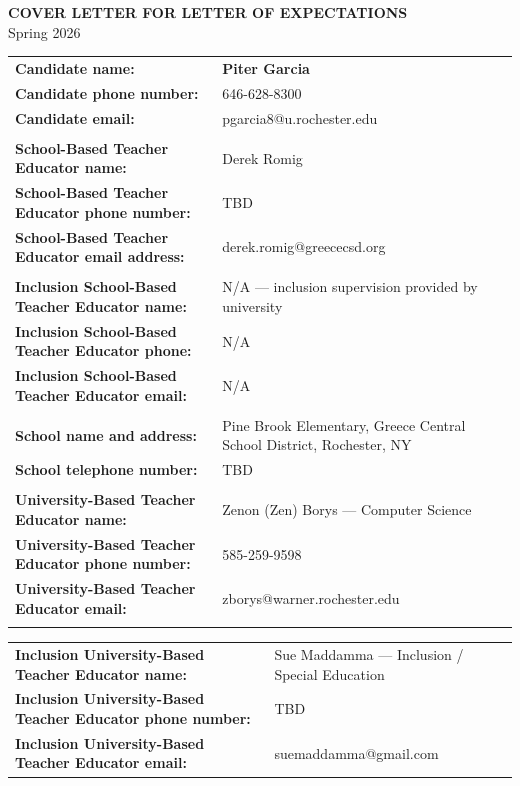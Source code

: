 \documentclass[10pt]{article}
\makeatletter
\newcommand{\CandidateName}{\textbf{Piter Garcia}}
\newcommand{\CandidatePhone}{646-628-8300}
\newcommand{\CandidateEmail}{pgarcia8@u.rochester.edu}
\newcommand{\SchoolBasedTeacherName}{Derek Romig}
\newcommand{\SchoolBasedTeacherPhone}{TBD}
\newcommand{\SchoolBasedTeacherEmail}{derek.romig@greececsd.org}
\newcommand{\InclusionSBTEName}{N/A — inclusion supervision provided by university}
\newcommand{\InclusionSBTEPhone}{N/A}
\newcommand{\InclusionSBTEEmail}{N/A}
\newcommand{\SchoolNameAddress}{Pine Brook Elementary, Greece Central School District, Rochester, NY}
\newcommand{\SchoolPhone}{TBD}
\newcommand{\UnivBasedTeacherName}{Zenon (Zen) Borys — Computer Science}
\newcommand{\UnivBasedTeacherPhone}{585-259-9598}
\newcommand{\UnivBasedTeacherEmail}{zborys@warner.rochester.edu}
\newcommand{\InclusionUnivBasedTeacherName}{Sue Maddamma — Inclusion / Special Education}
\newcommand{\InclusionUnivBasedTeacherPhone}{TBD}
\newcommand{\InclusionUnivBasedTeacherEmail}{suemaddamma@gmail.com}
\newcommand{\AcademicTerm}{Spring 2026}
\makeatother
\begin{document}
\begin{center}
{\LARGE\bfseries COVER LETTER FOR LETTER OF EXPECTATIONS}\\[0.5em]
{\AcademicTerm}\\
\end{center}

\vspace{1.25em}

\begin{tabular}{@{}p{}p{}@{}}
\textbf{Candidate name:} & \CandidateName \\
\textbf{Candidate phone number:} & \CandidatePhone \\
\textbf{Candidate email:} & \CandidateEmail \\
\\
\textbf{School-Based Teacher Educator name:} & \SchoolBasedTeacherName \\
\textbf{School-Based Teacher Educator phone number:} & \SchoolBasedTeacherPhone \\
\textbf{School-Based Teacher Educator email address:} & \SchoolBasedTeacherEmail \\
\\
\textbf{Inclusion School-Based Teacher Educator name:} & \InclusionSBTEName \\
\textbf{Inclusion School-Based Teacher Educator phone:} & \InclusionSBTEPhone \\
\textbf{Inclusion School-Based Teacher Educator email:} & \InclusionSBTEEmail \\
\\
\textbf{School name and address:} & \SchoolNameAddress \\
\textbf{School telephone number:} & \SchoolPhone \\
\\
\textbf{University-Based Teacher Educator name:} & \UnivBasedTeacherName \\
\textbf{University-Based Teacher Educator phone number:} & \UnivBasedTeacherPhone \\
\textbf{University-Based Teacher Educator email:} & \UnivBasedTeacherEmail \\
\\
\end{tabular}

\begin{tabular}{@{}p{}p{}@{}}
\textbf{Inclusion University-Based Teacher Educator name:} & \InclusionUnivBasedTeacherName \\
\textbf{Inclusion University-Based Teacher Educator phone number:} & \InclusionUnivBasedTeacherPhone \\
\textbf{Inclusion University-Based Teacher Educator email:} & \InclusionUnivBasedTeacherEmail \\
\end{tabular}
\vspace{1em}
\end{document}
